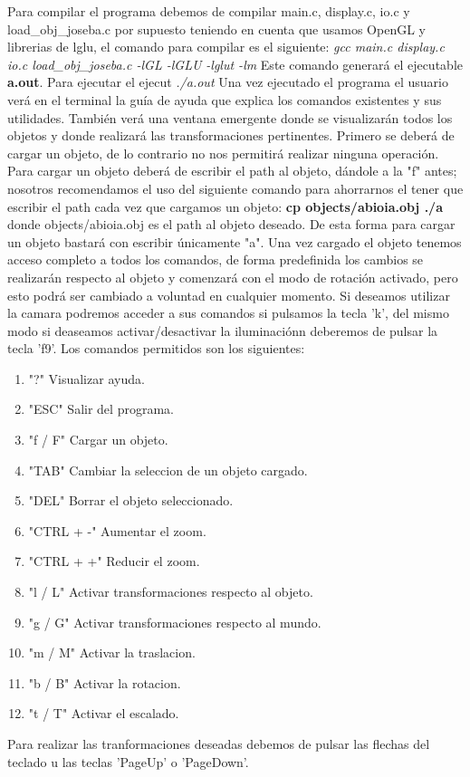 \documentclass[12pt,a4paper]{article}
\begin{document}
Para compilar el programa debemos de compilar main.c, display.c, io.c y load\_obj\_joseba.c por supuesto teniendo en cuenta que usamos OpenGL y librerias de lglu, el comando para compilar es el siguiente:\newline
\textit{gcc main.c  display.c io.c load\_obj\_joseba.c -lGL -lGLU -lglut -lm}\newline
Este comando generará el ejecutable \textbf{a.out}. \newline
Para ejecutar el ejecut\newline \textit{ ./a.out }\newline
Una vez ejecutado el programa el usuario verá en el terminal la guía de ayuda que explica los comandos existentes y sus utilidades. También verá una ventana emergente donde se visualizarán todos los objetos y donde realizará las transformaciones pertinentes. \newline
Primero se deberá de cargar un objeto, de lo contrario no nos permitirá realizar ninguna operación. Para cargar un objeto deberá de escribir el path al objeto, dándole a la "f" antes; nosotros recomendamos el uso del siguiente comando para ahorrarnos el tener que escribir el path cada vez que cargamos un objeto: \textbf{cp objects/abioia.obj ./a} donde objects/abioia.obj es el path al objeto deseado. De esta forma para cargar un objeto bastará con escribir únicamente "a".\newline
Una vez cargado el objeto tenemos acceso completo a todos los comandos, de forma predefinida los cambios se realizarán respecto al objeto y comenzará con el modo de rotación activado, pero esto podrá ser cambiado a voluntad en cualquier momento. Si deseamos utilizar la camara podremos acceder a sus comandos si pulsamos la tecla 'k', del mismo modo si deaseamos activar/desactivar la iluminaciónn deberemos de pulsar la tecla 'f9'.\newline
Los comandos permitidos son los siguientes:
\begin{enumerate}
\item "?"		 		 Visualizar ayuda.
\item "ESC"		 		 Salir del programa.
\item "f / F"				 Cargar un objeto.
\item "TAB"		 		 Cambiar la seleccion de un objeto cargado.
\item "DEL"				 Borrar el objeto seleccionado.
\item "CTRL + -"		 Aumentar el zoom.
\item "CTRL + +"		 Reducir el zoom.
\item "l / L"		 	 Activar transformaciones respecto al objeto.
\item "g / G"		 	 Activar transformaciones respecto al mundo.
\item "m / M"		 	 Activar la traslacion.
\item "b / B"			 Activar la rotacion.
\item "t / T"		 	 Activar el escalado.
\end{enumerate}
Para realizar las tranformaciones deseadas debemos de pulsar las flechas del teclado u las teclas 'PageUp' o 'PageDown'.\newline
\end{document}
